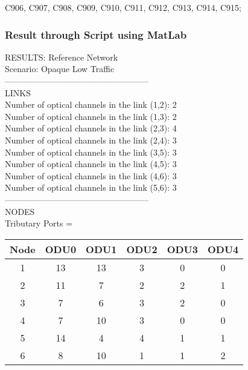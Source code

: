 C906, C907, C908, C909, C910, C911, C912, C913, C914, C915; \\


\subsubsection{Result through Script using MatLab}

\qquad RESULTS: Reference Network \\

\quad Scenario: Opaque Low Traffic \\

---------------------------------------------------\\
LINKS\\

Number of optical channels in the link (1,2): 2 \\
\qquad Number of optical channels in the link (1,3): 2 \\
\qquad Number of optical channels in the link (2,3): 4 \\
\qquad Number of optical channels in the link (2,4): 3 \\
\qquad Number of optical channels in the link (3,5): 3 \\
\qquad Number of optical channels in the link (4,5): 3 \\
\qquad Number of optical channels in the link (4,6): 3 \\
\qquad Number of optical channels in the link (5,6): 3 \\

---------------------------------------------------\\
NODES\\

Tributary Ports =\\

\begin{tabular}{|c|c|c|c|c|c|}
  \hline
  Node & ODU0 & ODU1 & ODU2 & ODU3 & ODU4 \\
  \hline\hline
  1 & 13 & 13 & 3 & 0 & 0 \\
  2 & 11 & 7 & 2 & 2 & 1 \\
  3 & 7 & 6 & 3 & 2 & 0 \\
  4 & 7 & 10 & 3 & 0 & 0 \\
  5 & 14 & 4 & 4 & 1 & 1 \\
  6 & 8 & 10 & 1 & 1 & 2 \\
  \hline
\end{tabular}

